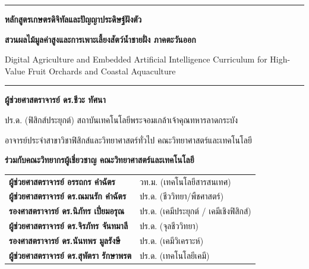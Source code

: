 \thispagestyle{empty}
\begin{center}
    \vspace*{1.5cm}
    
    {\color{rbruNavy}\rule{0.65\textwidth}{2pt}}
    \vspace{0.8cm}
    
    {\fontsize{24}{30}\selectfont\bfseries\color{rbruNavy} หลักสูตรเกษตรดิจิทัลและปัญญาประดิษฐ์ฝังตัว\par}
    \vspace{0.3cm}
    {\fontsize{18}{24}\selectfont\bfseries\color{durianGold} สวนผลไม้มูลค่าสูงและการเพาะเลี้ยงสัตว์น้ำชายฝั่ง ภาคตะวันออก\par}
    \vspace{0.5cm}
    {\fontsize{12}{16}\selectfont\color{slateGrey} Digital Agriculture and Embedded Artificial Intelligence Curriculum for High-Value Fruit Orchards and Coastal Aquaculture\par}
    
    \vspace{0.8cm}
    {\color{rbruGold}\rule{0.45\textwidth}{1.5pt}}
    
    \vspace{2.0cm}
    
    {\fontsize{15}{20}\selectfont\bfseries\color{rbruNavy} ผู้ช่วยศาสตราจารย์ ดร.ชีวะ ทัศนา\par}
    {\fontsize{12}{16}\selectfont ปร.ด. (ฟิสิกส์ประยุกต์) สถาบันเทคโนโลยีพระจอมเกล้าเจ้าคุณทหารลาดกระบัง\par}
    {\fontsize{12}{16}\selectfont อาจารย์ประจำสาขาวิชาฟิสิกส์และวิทยาศาสตร์ทั่วไป คณะวิทยาศาสตร์และเทคโนโลยี\par}
    
    \vspace{1.0cm}
    
    {\fontsize{13}{18}\selectfont\bfseries\color{agriForest} ร่วมกับคณะวิทยากรผู้เชี่ยวชาญ คณะวิทยาศาสตร์และเทคโนโลยี\par}
    \vspace{0.3cm}
    \begin{tabular}{ll}
        \textbf{ผู้ช่วยศาสตราจารย์ อรรถกร คำฉัตร} & วท.ม. (เทคโนโลยีสารสนเทศ) \\
        \textbf{ผู้ช่วยศาสตราจารย์ ดร.ณมนรัก คำฉัตร} & ปร.ด. (ชีววิทยา/พืชศาสตร์) \\
        \textbf{รองศาสตราจารย์ ดร.นิภัทร เปี่ยมอรุณ} & ปร.ด. (เคมีประยุกต์ / เคมีเชิงฟิสิกส์) \\
        \textbf{ผู้ช่วยศาสตราจารย์ ดร.จิรภัทร จันทมาลี} & ปร.ด. (จุลชีววิทยา) \\
        \textbf{รองศาสตราจารย์ ดร.นันทพร มูลรังษี} & ปร.ด. (เคมีวิเคราะห์) \\
        \textbf{ผู้ช่วยศาสตราจารย์ ดร.สุพัตรา รักษาพรต} & ปร.ด. (เทคโนโลยีเคมี) \\
    \end{tabular}
    

\end{center}
